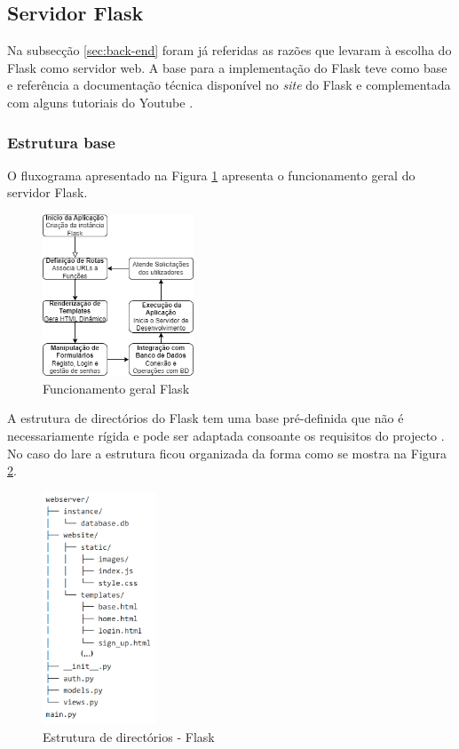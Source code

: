 \subsection{Servidor Flask}
\label{sec:flask}
Na subsecção \ref{sec:back-end} foram já referidas as razões que levaram à escolha do Flask como servidor web. A base para a implementação do Flask teve como base e referência a documentação técnica disponível no \textit{site} do Flask \cite{Flask} e complementada com alguns tutoriais do Youtube \cite{tutorialsiteflask, flaskDigitalOcean}.

\subsubsection{Estrutura base}
O fluxograma apresentado na Figura \ref{fig:funcflask} apresenta o funcionamento geral do servidor Flask.

\begin{figure}[hbtp]
	\centering
	\includegraphics[width=0.4\textwidth]{figures/fluxograma_flask.drawio.png}
	\caption{Funcionamento geral Flask}
	\label{fig:funcflask}
\end{figure}

A estrutura de directórios do Flask tem uma base pré-definida que não é necessariamente rígida e pode ser adaptada consoante os requisitos do projecto \cite{Flask}. No caso do \acrshort{lare} a estrutura ficou organizada da forma como se mostra na Figura \ref{fig:estruturapastas}.

\begin{figure}[hbtp]
	\centering
	\includegraphics[width=0.3\textwidth]{figures/tree_flask.png}
	\caption{Estrutura de directórios - Flask}
	\label{fig:estruturapastas}
\end{figure}

